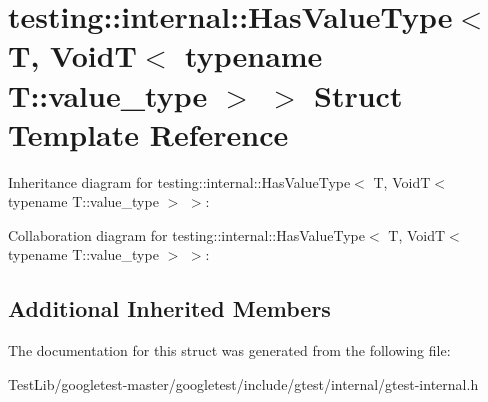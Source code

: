 \hypertarget{structtesting_1_1internal_1_1HasValueType_3_01T_00_01VoidT_3_01typename_01T_1_1value__type_01_4_01_4}{}\section{testing\+:\+:internal\+:\+:Has\+Value\+Type$<$ T, VoidT$<$ typename T\+:\+:value\+\_\+type $>$ $>$ Struct Template Reference}
\label{structtesting_1_1internal_1_1HasValueType_3_01T_00_01VoidT_3_01typename_01T_1_1value__type_01_4_01_4}


Inheritance diagram for testing\+:\+:internal\+:\+:Has\+Value\+Type$<$ T, VoidT$<$ typename T\+:\+:value\+\_\+type $>$ $>$\+:


Collaboration diagram for testing\+:\+:internal\+:\+:Has\+Value\+Type$<$ T, VoidT$<$ typename T\+:\+:value\+\_\+type $>$ $>$\+:
\subsection*{Additional Inherited Members}


The documentation for this struct was generated from the following file\+:\begin{DoxyCompactItemize}
\item 
Test\+Lib/googletest-\/master/googletest/include/gtest/internal/gtest-\/internal.\+h\end{DoxyCompactItemize}

